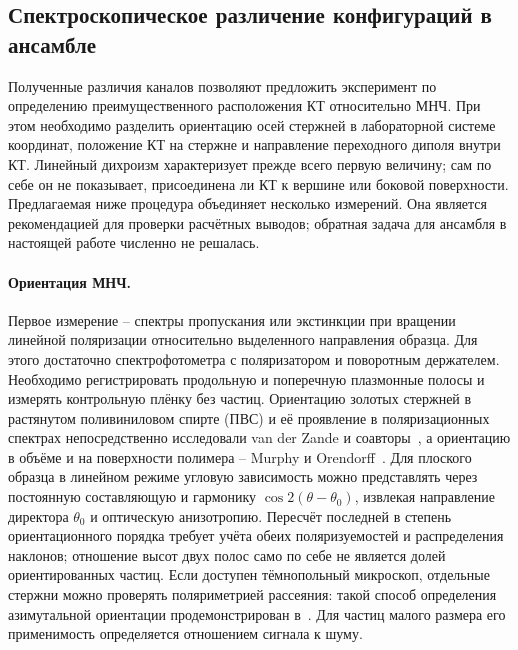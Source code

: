 \subsection{Спектроскопическое различение конфигураций в ансамбле}
\label{sec:experiment-spectroscopy}

Полученные различия каналов позволяют предложить эксперимент по определению
преимущественного расположения КТ относительно МНЧ. При этом необходимо
разделить ориентацию осей стержней в лабораторной системе координат,
положение КТ на стержне и направление переходного диполя внутри КТ.
Линейный дихроизм характеризует прежде всего первую величину; сам по себе
он не показывает, присоединена ли КТ к вершине или боковой поверхности.
Предлагаемая ниже процедура объединяет несколько измерений. Она является
рекомендацией для проверки расчётных выводов; обратная задача для ансамбля
в настоящей работе численно не решалась.

\paragraph{Ориентация МНЧ.}
Первое измерение -- спектры пропускания или экстинкции при вращении
линейной поляризации относительно выделенного направления образца.
Для этого достаточно спектрофотометра с поляризатором и поворотным
держателем. Необходимо регистрировать продольную и поперечную плазмонные
полосы и измерять контрольную плёнку без частиц. Ориентацию золотых
стержней в растянутом поливиниловом спирте (ПВС) и её проявление
в поляризационных спектрах непосредственно исследовали van der Zande
и соавторы~\cite{vanderzande1999}, а ориентацию в объёме и на поверхности
полимера -- Murphy и Orendorff~\cite{murphy2005}.
Для плоского образца в линейном режиме угловую зависимость можно
представлять через постоянную составляющую и гармонику
$\cos 2(\theta-\theta_0)$, извлекая направление директора $\theta_0$
и оптическую анизотропию. Пересчёт последней в степень ориентационного
порядка требует учёта обеих поляризуемостей и распределения наклонов;
отношение высот двух полос само по себе не является долей ориентированных
частиц. Если доступен тёмнопольный микроскоп, отдельные стержни можно
проверять поляриметрией рассеяния: такой способ определения азимутальной
ориентации продемонстрирован в~\cite{simo2025}. Для частиц малого размера
его применимость определяется отношением сигнала к шуму.


